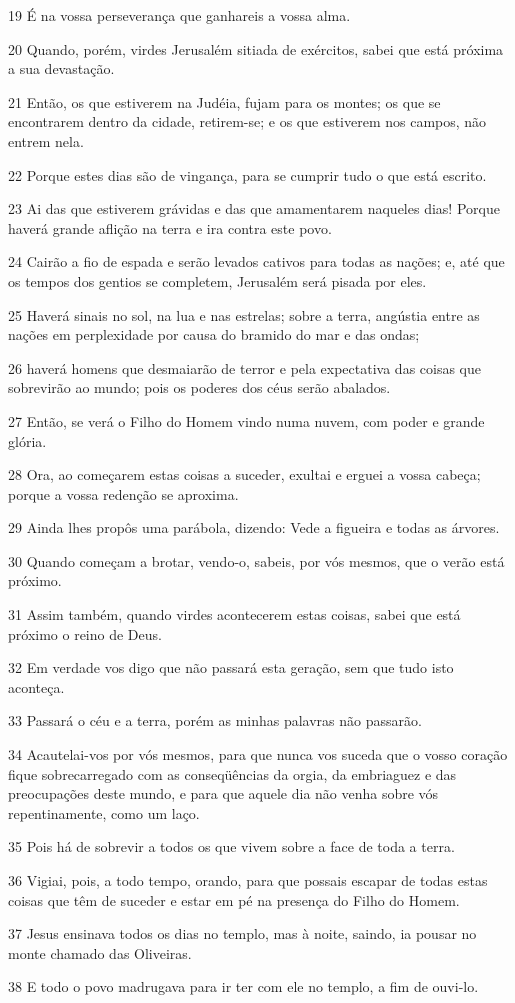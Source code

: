 \par 19 É na vossa perseverança que ganhareis a vossa alma.
\par 20 Quando, porém, virdes Jerusalém sitiada de exércitos, sabei que está próxima a sua devastação.
\par 21 Então, os que estiverem na Judéia, fujam para os montes; os que se encontrarem dentro da cidade, retirem-se; e os que estiverem nos campos, não entrem nela.
\par 22 Porque estes dias são de vingança, para se cumprir tudo o que está escrito.
\par 23 Ai das que estiverem grávidas e das que amamentarem naqueles dias! Porque haverá grande aflição na terra e ira contra este povo.
\par 24 Cairão a fio de espada e serão levados cativos para todas as nações; e, até que os tempos dos gentios se completem, Jerusalém será pisada por eles.
\par 25 Haverá sinais no sol, na lua e nas estrelas; sobre a terra, angústia entre as nações em perplexidade por causa do bramido do mar e das ondas;
\par 26 haverá homens que desmaiarão de terror e pela expectativa das coisas que sobrevirão ao mundo; pois os poderes dos céus serão abalados.
\par 27 Então, se verá o Filho do Homem vindo numa nuvem, com poder e grande glória.
\par 28 Ora, ao começarem estas coisas a suceder, exultai e erguei a vossa cabeça; porque a vossa redenção se aproxima.
\par 29 Ainda lhes propôs uma parábola, dizendo: Vede a figueira e todas as árvores.
\par 30 Quando começam a brotar, vendo-o, sabeis, por vós mesmos, que o verão está próximo.
\par 31 Assim também, quando virdes acontecerem estas coisas, sabei que está próximo o reino de Deus.
\par 32 Em verdade vos digo que não passará esta geração, sem que tudo isto aconteça.
\par 33 Passará o céu e a terra, porém as minhas palavras não passarão.
\par 34 Acautelai-vos por vós mesmos, para que nunca vos suceda que o vosso coração fique sobrecarregado com as conseqüências da orgia, da embriaguez e das preocupações deste mundo, e para que aquele dia não venha sobre vós repentinamente, como um laço.
\par 35 Pois há de sobrevir a todos os que vivem sobre a face de toda a terra.
\par 36 Vigiai, pois, a todo tempo, orando, para que possais escapar de todas estas coisas que têm de suceder e estar em pé na presença do Filho do Homem.
\par 37 Jesus ensinava todos os dias no templo, mas à noite, saindo, ia pousar no monte chamado das Oliveiras.
\par 38 E todo o povo madrugava para ir ter com ele no templo, a fim de ouvi-lo.

